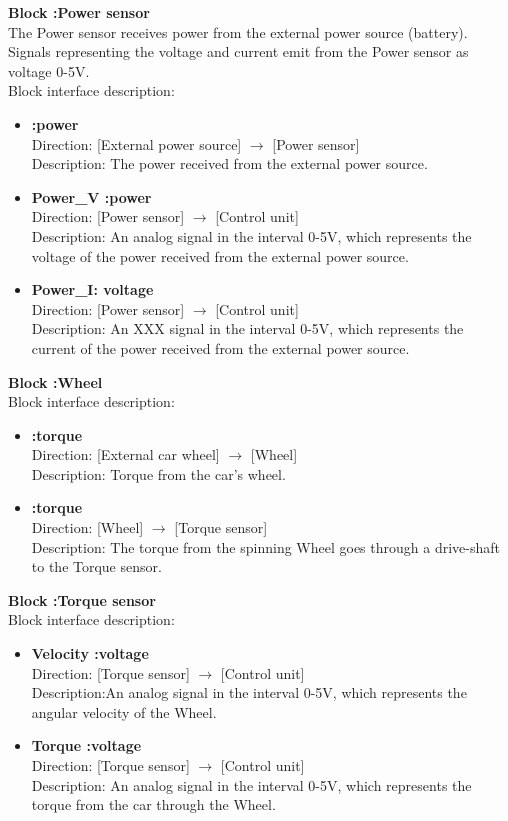 \textbf{Block :Power sensor}\\
The Power sensor receives power from the external power source (battery). Signals representing the voltage and current emit from the Power sensor as voltage 0-5V.\\
Block interface description:

\begin{itemize}
	\item \textbf{:power}\\
		Direction: [External power source] $\rightarrow$ [Power sensor]\\
		Description: The power received from the external power source.
	\item \textbf{Power\_V :power}\\
		Direction: [Power sensor] $\rightarrow$ [Control unit]\\
		Description: An analog signal in the interval 0-5V, which represents the voltage of the power received from the external power source.
	\item \textbf{Power\_I: voltage}\\
		Direction: [Power sensor] $\rightarrow$ [Control unit]\\
		Description: An XXX signal in the interval 0-5V, which represents the current of the power received from the external power source.
\end{itemize}

\textbf{Block :Wheel}\\
Block interface description:

\begin{itemize}
	\item \textbf{:torque}\\
		Direction: [External car wheel] $\rightarrow$ [Wheel]\\
		Description: Torque from the car's wheel.
	\item \textbf{:torque}\\
		Direction: [Wheel] $\rightarrow$ [Torque sensor]\\
		Description: The torque from the spinning Wheel goes through a drive-shaft to the Torque sensor.
\end{itemize}

\textbf{Block :Torque sensor}\\
Block interface description:

\begin{itemize}
	\item \textbf{Velocity :voltage}\\
		Direction: [Torque sensor] $\rightarrow$ [Control unit]\\
		Description:An analog signal in the interval 0-5V, which represents the angular velocity of the Wheel.
	\item \textbf{Torque :voltage}\\
		Direction: [Torque sensor] $\rightarrow$ [Control unit]\\
		Description: An analog signal in the interval 0-5V, which represents the torque from the car through the Wheel.
\end{itemize}

